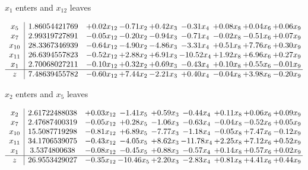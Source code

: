 \documentclass[8pt]{article}
\begin{document}
 $ x_{1} $ enters and $ x_{12} $ leaves 

 \[\begin{array}{c| c c@{\hskip 2pt} c@{\hskip 2pt} c@{\hskip 2pt} c@{\hskip 2pt} c@{\hskip 2pt} c@{\hskip 2pt} c@{\hskip 2pt} }
 x_{5}   &  1.86054421769 & +  0.02 x_{12} & -0.71 x_{2} & +  0.42 x_{3} & -0.31 x_{4} & +  0.08 x_{8} & +  0.04 x_{6} & +  0.06 x_{9}\\
 x_{7}   &  2.99319727891 & -0.05 x_{12} & -0.20 x_{2} & -0.94 x_{3} & -0.71 x_{4} & -0.02 x_{8} & -0.51 x_{6} & +  0.07 x_{9}\\
 x_{10}   &  28.3367346939 & -0.64 x_{12} & -4.90 x_{2} & -4.86 x_{3} & -3.31 x_{4} & +  0.51 x_{8} & +  7.76 x_{6} & +  0.30 x_{9}\\
 x_{11}   &  26.6394557823 & -0.52 x_{12} & +  2.88 x_{2} & +  6.91 x_{3} & -10.52 x_{4} & +  1.92 x_{8} & +  6.96 x_{6} & +  0.27 x_{9}\\
 x_{1}   &  2.70068027211 & -0.10 x_{12} & +  0.32 x_{2} & +  0.69 x_{3} & -0.43 x_{4} & +  0.10 x_{8} & +  0.55 x_{6} & -0.01 x_{9}\\
\hline
z    &  7.48639455782 & -0.60 x_{12} & +  7.44 x_{2} & -2.21 x_{3} & +  0.40 x_{4} & -0.04 x_{8} & +  3.98 x_{6} & -0.20 x_{9}\\
\end{array}\]


 $ x_{2} $ enters and $ x_{5} $ leaves 

 \[\begin{array}{c| c c@{\hskip 2pt} c@{\hskip 2pt} c@{\hskip 2pt} c@{\hskip 2pt} c@{\hskip 2pt} c@{\hskip 2pt} c@{\hskip 2pt} }
 x_{2}   &  2.61722488038 & +  0.03 x_{12} & -1.41 x_{5} & +  0.59 x_{3} & -0.44 x_{4} & +  0.11 x_{8} & +  0.06 x_{6} & +  0.09 x_{9}\\
 x_{7}   &  2.47687400319 & -0.05 x_{12} & +  0.28 x_{5} & -1.06 x_{3} & -0.63 x_{4} & -0.04 x_{8} & -0.52 x_{6} & +  0.05 x_{9}\\
 x_{10}   &  15.5087719298 & -0.81 x_{12} & +  6.89 x_{5} & -7.77 x_{3} & -1.18 x_{4} & -0.05 x_{8} & +  7.47 x_{6} & -0.12 x_{9}\\
 x_{11}   &  34.1706539075 & -0.43 x_{12} & -4.05 x_{5} & +  8.62 x_{3} & -11.78 x_{4} & +  2.25 x_{8} & +  7.12 x_{6} & +  0.52 x_{9}\\
 x_{1}   &  3.5374800638 & -0.08 x_{12} & -0.45 x_{5} & +  0.88 x_{3} & -0.57 x_{4} & +  0.14 x_{8} & +  0.57 x_{6} & +  0.02 x_{9}\\
\hline
z    &  26.9553429027 & -0.35 x_{12} & -10.46 x_{5} & +  2.20 x_{3} & -2.83 x_{4} & +  0.81 x_{8} & +  4.41 x_{6} & +  0.44 x_{9}\\
\end{array}\]
\end{document}
